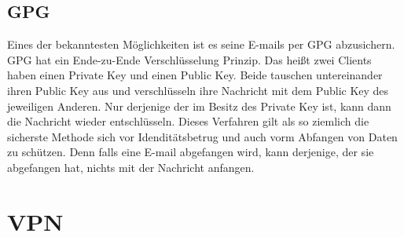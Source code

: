 \documentclass[fontsize=12pt]{scrreprt}
\begin{document}
	\subsection{GPG}
	Eines der bekanntesten Möglichkeiten ist es seine E-mails per GPG abzusichern. GPG hat ein Ende-zu-Ende Verschlüsselung Prinzip. Das heißt zwei Clients haben einen Private Key und einen Public Key. Beide tauschen untereinander ihren Public Key aus und verschlüsseln ihre Nachricht mit dem Public Key des jeweiligen Anderen. Nur derjenige der im Besitz des Private Key ist, kann dann die Nachricht wieder entschlüsseln. Dieses Verfahren gilt als so ziemlich die sicherste Methode sich vor Idenditätsbetrug und auch vorm Abfangen von Daten zu schützen. Denn falls eine E-mail abgefangen wird, kann derjenige, der sie abgefangen hat, nichts mit der Nachricht anfangen.
	\section{VPN}
\end{document}
